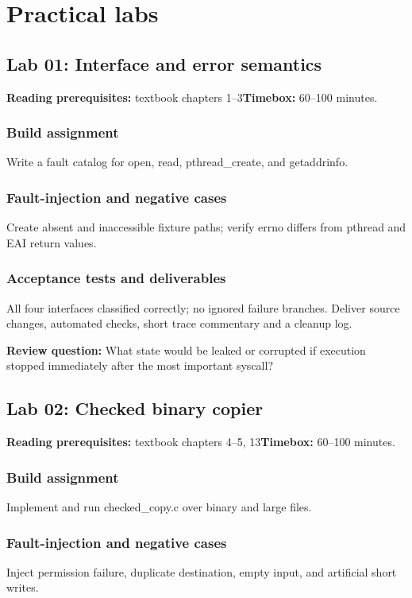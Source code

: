 \documentclass[11pt,letterpaper,oneside]{report}
\begin{document}
\chapter{Practical labs}
\section{Lab 01: Interface and error semantics}
\textbf{Reading prerequisites:} textbook chapters 1--3\quad \textbf{Timebox:} 60--100 minutes.

\subsection{Build assignment}
Write a fault catalog for open, read, pthread\_create, and getaddrinfo.

\subsection{Fault-injection and negative cases}
Create absent and inaccessible fixture paths; verify errno differs from pthread and EAI return values.

\subsection{Acceptance tests and deliverables}
All four interfaces classified correctly; no ignored failure branches. Deliver source changes, automated checks, short trace commentary and a cleanup log.

\textbf{Review question:} What state would be leaked or corrupted if execution stopped immediately after the most important syscall?

\section{Lab 02: Checked binary copier}
\textbf{Reading prerequisites:} textbook chapters 4--5, 13\quad \textbf{Timebox:} 60--100 minutes.

\subsection{Build assignment}
Implement and run checked\_copy.c over binary and large files.

\subsection{Fault-injection and negative cases}
Inject permission failure, duplicate destination, empty input, and artificial short writes.
\end{document}
